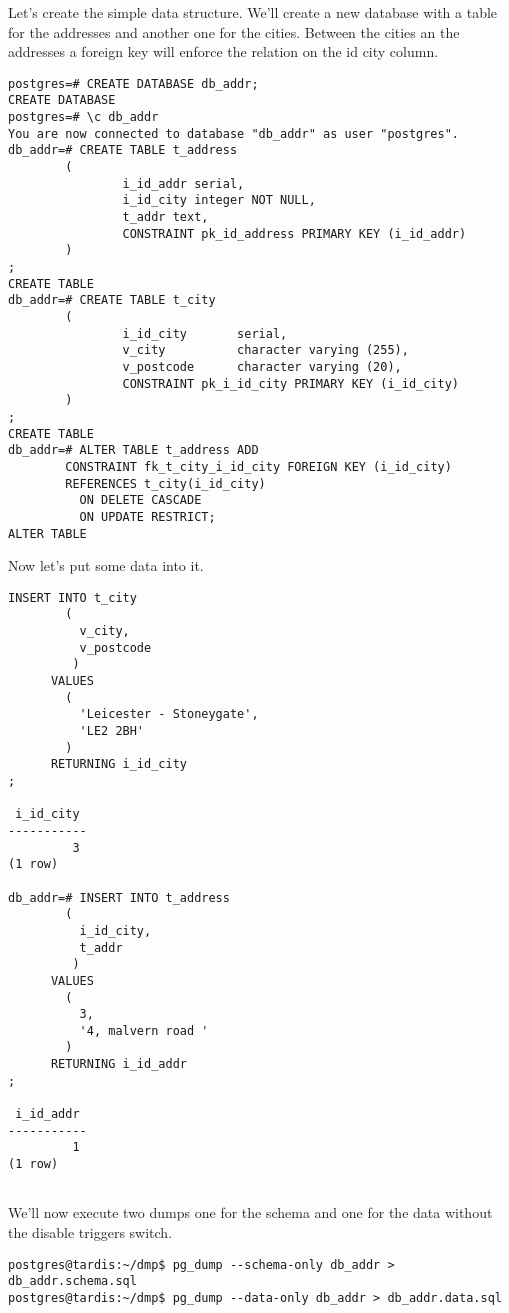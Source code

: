Let's create the simple data structure. We'll create a new database with a table for the addresses 
and another one for the cities. Between the cities an the addresses a foreign key will enforce the 
relation on the id city column.

\begin{lstlisting}[style=pgsql]
postgres=# CREATE DATABASE db_addr;
CREATE DATABASE
postgres=# \c db_addr 
You are now connected to database "db_addr" as user "postgres".
db_addr=# CREATE TABLE t_address
        (
                i_id_addr serial,
                i_id_city integer NOT NULL,
                t_addr text,
                CONSTRAINT pk_id_address PRIMARY KEY (i_id_addr)
        )
;
CREATE TABLE
db_addr=# CREATE TABLE t_city
        (
                i_id_city       serial,
                v_city          character varying (255),
                v_postcode      character varying (20),
                CONSTRAINT pk_i_id_city PRIMARY KEY (i_id_city)
        )
;
CREATE TABLE
db_addr=# ALTER TABLE t_address ADD 
	    CONSTRAINT fk_t_city_i_id_city FOREIGN KEY (i_id_city)  
	    REFERENCES t_city(i_id_city) 
	      ON DELETE CASCADE 
	      ON UPDATE RESTRICT;
ALTER TABLE

\end{lstlisting}

Now let's put some data into it.

\begin{lstlisting}[style=pgsql]
INSERT INTO t_city
	    ( 
	      v_city,	
	      v_postcode
	     )
      VALUES
	    (
	      'Leicester - Stoneygate',
	      'LE2 2BH'
	    )
      RETURNING i_id_city
;

 i_id_city 
-----------
         3
(1 row)

db_addr=# INSERT INTO t_address
	    ( 
	      i_id_city,	
	      t_addr
	     )
      VALUES
	    (
	      3,
	      '4, malvern road '
	    )
      RETURNING i_id_addr
;

 i_id_addr 
-----------
         1
(1 row)


\end{lstlisting}

We'll now execute two dumps one for the schema and one for the data without the disable triggers 
switch.

\begin{verbatim}
postgres@tardis:~/dmp$ pg_dump --schema-only db_addr > db_addr.schema.sql
postgres@tardis:~/dmp$ pg_dump --data-only db_addr > db_addr.data.sql

\end{verbatim}

